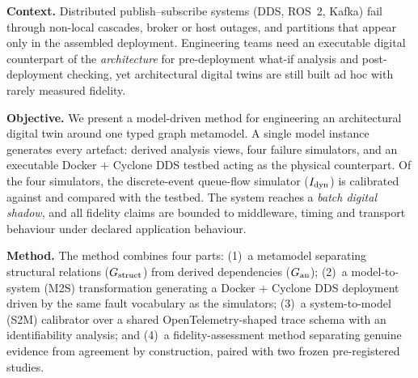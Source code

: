 \textbf{Context.} Distributed publish--subscribe systems (DDS, ROS~2, Kafka) fail through non-local cascades, broker or host outages, and partitions that appear only in the assembled deployment. Engineering teams need an executable digital counterpart of the \emph{architecture} for pre-deployment what-if analysis and post-deployment checking, yet architectural digital twins are still built ad hoc with rarely measured fidelity.

\textbf{Objective.} We present a model-driven method for engineering an architectural digital twin around one typed graph metamodel. A single model instance generates every artefact: derived analysis views, four failure simulators, and an executable Docker + Cyclone DDS testbed acting as the physical counterpart. Of the four simulators, the discrete-event queue-flow simulator ($I_{\mathrm{dyn}}$) is calibrated against and compared with the testbed. The system reaches a \emph{batch digital shadow}, and all fidelity claims are bounded to middleware, timing and transport behaviour under declared application behaviour.

\textbf{Method.} The method combines four parts: (1)~a metamodel separating structural relations ($G_{\mathrm{struct}}$) from derived dependencies ($G_{\mathrm{an}}$); (2)~a model-to-system (M2S) transformation generating a Docker + Cyclone DDS deployment driven by the same fault vocabulary as the simulators; (3)~a system-to-model (S2M) calibrator over a shared OpenTelemetry-shaped trace schema with an identifiability analysis; and (4)~a fidelity-assessment method separating genuine evidence from agreement by construction, paired with two frozen pre-registered studies.

